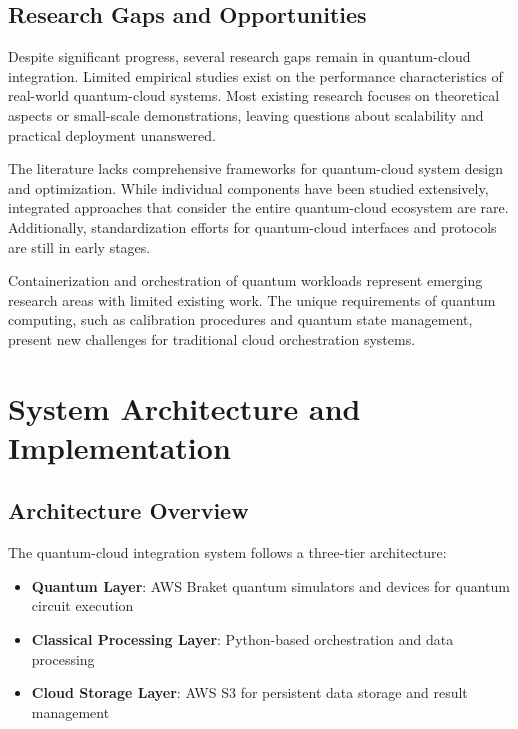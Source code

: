 \documentclass[onecolumn]{IEEEtran}
\begin{document}
\subsection{Research Gaps and Opportunities}

Despite significant progress, several research gaps remain in quantum-cloud integration. Limited empirical studies exist on the performance characteristics of real-world quantum-cloud systems. Most existing research focuses on theoretical aspects or small-scale demonstrations, leaving questions about scalability and practical deployment unanswered.

The literature lacks comprehensive frameworks for quantum-cloud system design and optimization. While individual components have been studied extensively, integrated approaches that consider the entire quantum-cloud ecosystem are rare. Additionally, standardization efforts for quantum-cloud interfaces and protocols are still in early stages.

Containerization and orchestration of quantum workloads represent emerging research areas with limited existing work. The unique requirements of quantum computing, such as calibration procedures and quantum state management, present new challenges for traditional cloud orchestration systems.

\section{System Architecture and Implementation}

\subsection{Architecture Overview}

The quantum-cloud integration system follows a three-tier architecture:

\begin{itemize}
    \item \textbf{Quantum Layer}: AWS Braket quantum simulators and devices for quantum circuit execution
    \item \textbf{Classical Processing Layer}: Python-based orchestration and data processing
    \item \textbf{Cloud Storage Layer}: AWS S3 for persistent data storage and result management
\end{itemize}
\end{document}
